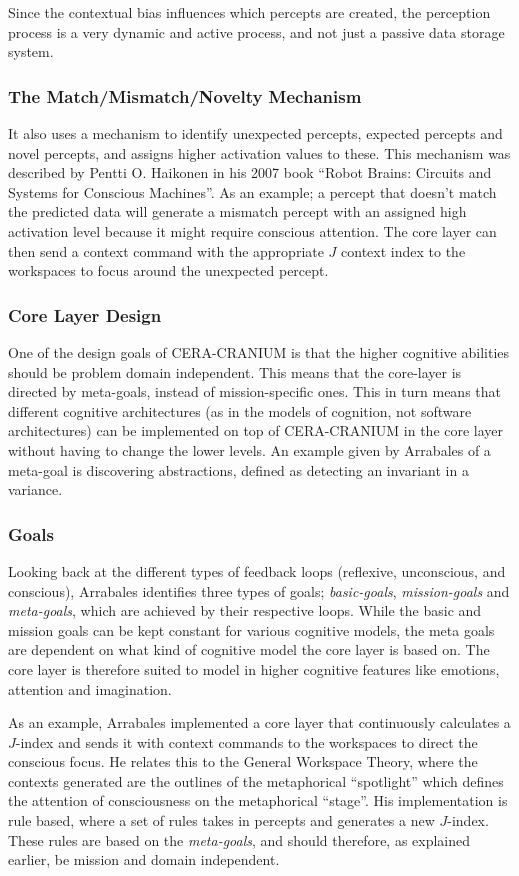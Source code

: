 Since the contextual bias influences which percepts are created, the perception
process is a very dynamic and active process, and not just a passive data
storage system.

\subsubsection{The Match/Mismatch/Novelty Mechanism}
It also uses a mechanism to identify unexpected percepts, expected percepts and
novel percepts, and assigns higher activation values to these. This mechanism
was described by Pentti O. Haikonen in his 2007 book ``Robot Brains: Circuits
and Systems for Conscious Machines''\cite{haikonen2007robotbrains}. As an
example; a percept that doesn't match the predicted data will generate a
mismatch percept with an assigned high activation level because it might
require conscious attention. The core layer can then send a context command
with the appropriate $J$ context index to the workspaces to focus around the
unexpected percept.

\subsubsection{Core Layer Design}
One of the design goals of CERA-CRANIUM is that the higher cognitive abilities
should be problem domain independent.\cite{arrabales2009ceracranium} This means
that the core-layer is directed by meta-goals, instead of mission-specific ones.
This in turn means that different cognitive architectures (as in the models of
cognition, not software architectures) can be implemented on top of CERA-CRANIUM
in the core layer without having to change the lower levels. An example given by
Arrabales of a meta-goal is discovering abstractions, defined as detecting an
invariant in a variance.

\subsubsection{Goals}
Looking back at the different types of feedback loops (reflexive, unconscious,
and conscious), Arrabales identifies three types of goals;
\textit{basic-goals}, \textit{mission-goals} and \textit{meta-goals}, which are
achieved by their respective loops. While the basic and mission goals can be
kept constant for various cognitive models, the meta goals are dependent
on what kind of cognitive model the core layer is based on. The core
layer is therefore suited to model in higher cognitive features like emotions,
attention and imagination.

As an example, Arrabales implemented a core layer that continuously calculates a
$J$-index and sends it with context commands to the workspaces to direct the
conscious focus. He relates this to the General Workspace Theory, where the
contexts generated are the outlines of the metaphorical ``spotlight'' which
defines the attention of consciousness on the metaphorical
``stage''.\cite{baars2005gwt} His implementation is rule based, where a set of
rules takes in percepts and generates a new $J$-index. These rules are based on
the \textit{meta-goals}, and should therefore, as explained earlier, be mission
and domain independent.